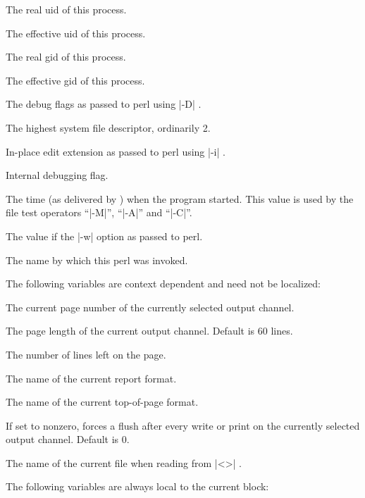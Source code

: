 \begin{enum}{1cm}
The real uid of this process.

The effective uid of this process. 

The real gid of this process.

The effective gid of this process.

The debug flags as passed to perl using |-D| .

The highest system file descriptor, ordinarily 2.

In-place edit extension as passed to perl using |-i| .

Internal debugging flag.

The time (as delivered by ) when the program started. This
value is used by the file test operators ``|-M|'', ``|-A|'' and
``|-C|''.

The value if the |-w| option as passed to perl.

The name by which this perl was invoked.

\end{enum}

The following variables are context dependent and need not be
localized:

\begin{enum}{1cm}

The current page number of the currently selected output channel.

The page length of the current output channel. Default is 60 lines.

The number of lines left on the page.

The name of the current report format.

The name of the current top-of-page format.

If set to nonzero, forces a flush after every write or print on the
currently selected output channel. Default is 0. 

The name of the current file when reading from |<>| .
\end{enum}

The following variables are always local to the current block:


